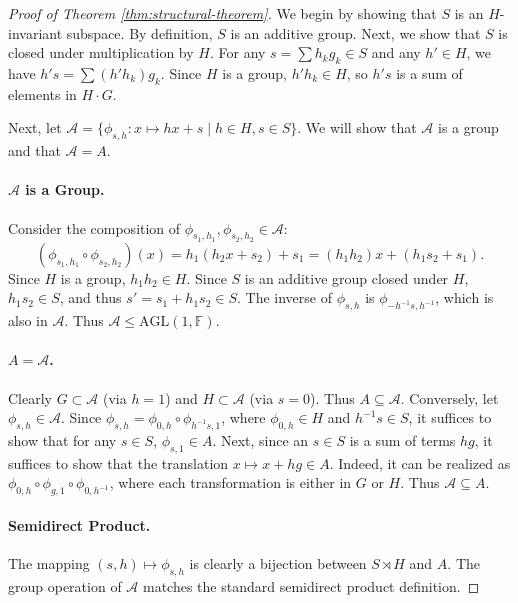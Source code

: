 \documentclass[11pt]{article}
\theoremstyle{plain}
\theoremstyle{definition}
\begin{document}
\begin{proof}[Proof of Theorem \ref{thm:structural-theorem}]
We begin by showing that $S$ is an $H$-invariant subspace.
By definition, $S$ is an additive group. Next, we show that $S$ is closed under multiplication by $H$. For any $s = \sum h_k g_k \in S$ and any $h' \in H$, we have $h's = \sum (h'h_k)g_k$. Since $H$ is a group, $h'h_k \in H$, so $h's$ is a sum of elements in $H \cdot G$.

Next, let $\mathcal{A} = \{ \phi_{s,h} : x \mapsto hx + s \mid h \in H, s \in S \}$. We will show that $\mathcal{A}$ is  a group and that $\mathcal{A}=A.$

\paragraph{$\mathcal{A}$ is a Group.}
Consider the composition of $\phi_{s_1, h_1}, \phi_{s_2, h_2} \in \mathcal{A}$:
\[
    (\phi_{s_1, h_1} \circ \phi_{s_2, h_2})(x) = h_1(h_2 x + s_2) + s_1 = (h_1 h_2)x + (h_1 s_2 + s_1).
\]
Since $H$ is a group, $h_1 h_2 \in H$. Since $S$ is an additive group closed under $H$, $h_1 s_2 \in S$, and thus $s' = s_1 + h_1 s_2 \in S$. The inverse of $\phi_{s,h}$ is $\phi_{-h^{-1}s, h^{-1}}$, which is also in $\mathcal{A}$. Thus $\mathcal{A} \le \mathrm{AGL}(1, \mathbb{F})$.

\paragraph{$A = \mathcal{A}$.}
Clearly $G \subset \mathcal{A}$ (via $h=1$) and $H \subset \mathcal{A}$ (via $s=0$). Thus $A \subseteq \mathcal{A}$. Conversely, let $\phi_{s,h}\in \mathcal{A}$. Since $\phi_{s,h}=\phi_{0,h}\circ \phi_{h^{-1}s,1}$, where $\phi_{0,h}\in H$ and $h^{-1}s\in S$, it suffices to show  that for any $ s \in S$, $\phi_{s,1}\in A.$ Next, since an $s\in S$ is a sum of terms $hg$, it suffices to show that the translation $x \mapsto x + hg\in A$. Indeed, it  can be realized as  $\phi_{0,h} \circ \phi_{g,1} \circ \phi_{0, h^{-1}}$, where each transformation is either in $G$ or $H$.  Thus $\mathcal{A} \subseteq A$.

\paragraph{Semidirect Product.}
The mapping $(s, h) \mapsto \phi_{s,h}$ is clearly a bijection between $S \rtimes H$ and $A$. The group operation of $\mathcal{A}$ matches the standard semidirect product definition.
\end{proof}
\end{document}
